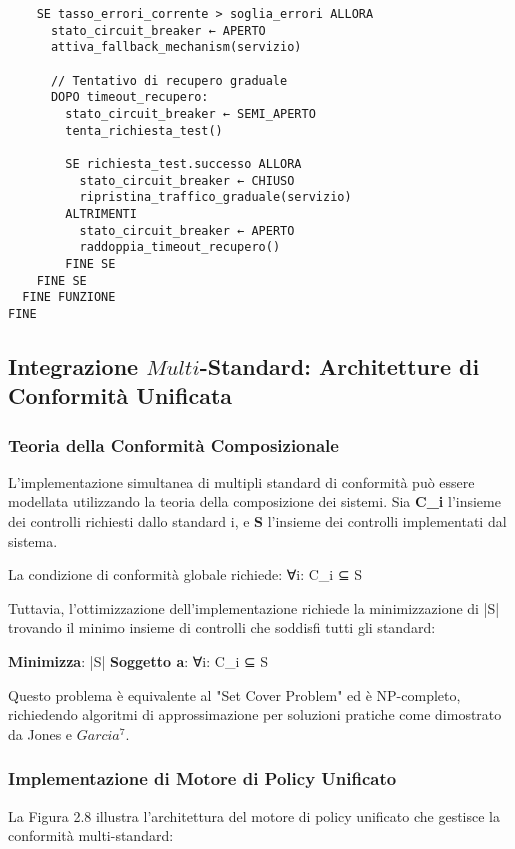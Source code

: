 {{\begin{verbatim}
    SE tasso_errori_corrente > soglia_errori ALLORA
      stato_circuit_breaker ← APERTO
      attiva_fallback_mechanism(servizio)
      
      // Tentativo di recupero graduale
      DOPO timeout_recupero:
        stato_circuit_breaker ← SEMI_APERTO
        tenta_richiesta_test()
        
        SE richiesta_test.successo ALLORA
          stato_circuit_breaker ← CHIUSO
          ripristina_traffico_graduale(servizio)
        ALTRIMENTI
          stato_circuit_breaker ← APERTO
          raddoppia_timeout_recupero()
        FINE SE
    FINE SE
  FINE FUNZIONE
FINE
\end{verbatim}

\subsection{Integrazione $Multi$-Standard: Architetture di Conformità Unificata}

\subsubsection{Teoria della Conformità Composizionale}

L'implementazione simultanea di multipli standard di conformità può essere modellata utilizzando la teoria della composizione dei sistemi. Sia \textbf{C_i} l'insieme dei controlli richiesti dallo standard i, e \textbf{S} l'insieme dei controlli implementati dal sistema.

La condizione di conformità globale richiede:
∀i: C_i ⊆ S

Tuttavia, l'ottimizzazione dell'implementazione richiede la minimizzazione di |S| trovando il minimo insieme di controlli che soddisfi tutti gli standard:

\textbf{Minimizza}: |S|
\textbf{Soggetto a}: ∀i: C_i ⊆ S

Questo problema è equivalente al "Set Cover Problem" ed è NP-completo, richiedendo algoritmi di approssimazione per soluzioni pratiche come dimostrato da Jones e $Garcia$$^{7}$.

\subsubsection{Implementazione di Motore di Policy Unificato}

La Figura 2.8 illustra l'architettura del motore di policy unificato che gestisce la conformità multi-standard:

}}
